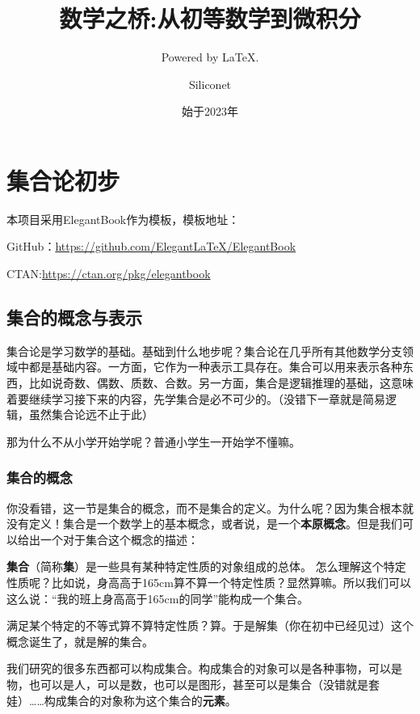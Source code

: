 \documentclass[lang=cn,math=cm,chinesefont=nofont,11pt,scheme=chinese]{elegantbook}
\title{数学之桥:从初等数学到微积分}
\subtitle{Powered by \LaTeX.}
\author{Siliconet}
\date{始于2023年}
\begin{document}
\maketitle
\frontmatter

\tableofcontents

\mainmatter

\chapter{集合论初步}

本项目采用ElegantBook作为模板，模板地址：

GitHub：\href{https://github.com/ElegantLaTeX/ElegantBook}{https://github.com/ElegantLaTeX/ElegantBook}

CTAN:\href{https://ctan.org/pkg/elegantbook}{https://ctan.org/pkg/elegantbook}

\section{集合的概念与表示}
集合论是学习数学的基础。基础到什么地步呢？集合论在几乎所有其他数学分支领域中都是基础内容。一方面，它作为一种表示工具存在。集合可以用来表示各种东西，比如说奇数、偶数、质数、合数。另一方面，集合是逻辑推理的基础，这意味着要继续学习接下来的内容，先学集合是必不可少的。（没错下一章就是简易逻辑，虽然集合论远不止于此）

那为什么不从小学开始学呢？普通小学生一开始学不懂嘛。

\subsection{集合的概念}

你没看错，这一节是集合的概念，而不是集合的定义。为什么呢？因为集合根本就没有定义！集合是一个数学上的基本概念，或者说，是一个\textbf{本原概念}。但是我们可以给出一个对于集合这个概念的描述：


\textbf{集合}（简称\textbf{集}）是一些具有某种特定性质的对象组成的总体。
怎么理解这个特定性质呢？比如说，身高高于165cm算不算一个特定性质？显然算嘛。所以我们可以这么说：“我的班上身高高于165cm的同学”能构成一个集合。

满足某个特定的不等式算不算特定性质？算。于是解集（你在初中已经见过）这个概念诞生了，就是解的集合。

我们研究的很多东西都可以构成集合。构成集合的对象可以是各种事物，可以是物，也可以是人，可以是数，也可以是图形，甚至可以是集合（没错就是套娃）……构成集合的对象称为这个集合的\textbf{元素}。
\end{document}
